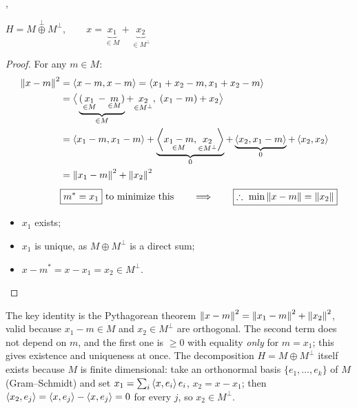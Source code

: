 \sep
\begin{keybox}[width=0.45\linewidth]
$H = M\overset{\perp}{\oplus} M^\perp, \qquad
x = \underbrace{x_1}_{\in M} + \underbrace{x_2}_{\in M^\perp}$
\end{keybox}
\begin{proof}
For any $m\in M$:
\begin{align*}
\left\lVert x-m \right\rVert^2 &= \left\langle x-m, x-m \right\rangle = \left\langle x_1+x_2-m, x_1+x_2-m \right\rangle\\
&= \big\langle \underbrace{(\underset{\in M}{x_1}-\underset{\in M}{m})}_{\in M} + \underset{\in M^\perp}{x_2},\; (x_1-m)+x_2 \big\rangle\\
&= \left\langle x_1-m, x_1-m \right\rangle + \underbrace{\left\langle \underset{\in M}{x_1-m}, \underset{\in M^\perp}{x_2} \right\rangle}_{0} + \underbrace{\left\langle x_2, x_1-m \right\rangle}_{0} + \left\langle x_2, x_2 \right\rangle\\
&= \left\lVert x_1-m \right\rVert^2 + \left\lVert x_2 \right\rVert^2\\[4pt]
&\boxed{m^*=x_1} \text{ to minimize this}
\qquad\Longrightarrow\qquad
\boxed{\therefore\ \min \left\lVert x-m \right\rVert = \left\lVert x_2 \right\rVert}
\end{align*}
\begin{itemize}[nosep]
  \item $x_1$ exists;
  \item $x_1$ is unique, as $M\oplus M^\perp$ is a direct sum;
  \item $x-m^* = x-x_1 = x_2\in M^\perp$. \qedhere
\end{itemize}
\end{proof}

\begin{insight}
The key identity is the Pythagorean theorem $\left\lVert x-m \right\rVert^2 = \left\lVert x_1-m \right\rVert^2 + \left\lVert x_2 \right\rVert^2$, valid because
$x_1-m\in M$ and $x_2\in M^\perp$ are orthogonal. The second term does not depend on $m$, and the first one is
$\ge 0$ with equality \emph{only} for $m=x_1$; this gives existence and uniqueness at once.
The decomposition $H = M\oplus M^\perp$ itself exists because $M$ is finite dimensional: take an orthonormal
basis $\{e_1,\dots,e_k\}$ of $M$ (Gram--Schmidt) and set $x_1=\sum_i \left\langle x, e_i \right\rangle e_i$, $x_2 = x-x_1$;
then $\left\langle x_2, e_j \right\rangle = \left\langle x, e_j \right\rangle-\left\langle x, e_j \right\rangle = 0$ for every $j$, so $x_2\in M^\perp$.
\end{insight}

